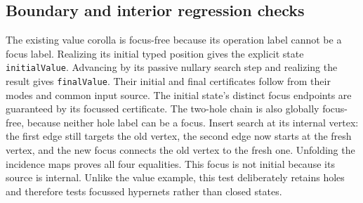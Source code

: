 \subsection{Boundary and interior regression checks}
The existing value corolla is focus-free because its operation label cannot
be a focus label. Realizing its initial typed position gives the explicit
state \texttt{initialValue}. Advancing by its passive nullary search step and
realizing the result gives \texttt{finalValue}. Their initial and final
certificates follow from their modes and common input source. The initial
state's distinct focus endpoints are guaranteed by its focussed certificate.
The two-hole chain is also globally focus-free, because neither hole label can
be a focus. Insert search at its internal vertex: the first edge still targets
the old vertex, the second edge now starts at the fresh vertex, and the new
focus connects the old vertex to the fresh one. Unfolding the incidence maps
proves all four equalities. This focus is not initial because its source is
internal. Unlike the value example, this test deliberately retains holes and
therefore tests focussed hypernets rather than closed states.
